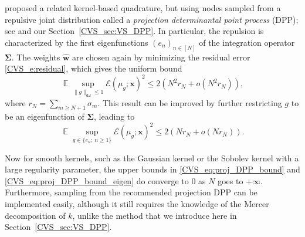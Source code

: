 \documentclass[twoside,11pt]{book}
\numberwithin{theorem}{chapter}
\numberwithin{definition}{chapter}
\numberwithin{proposition}{chapter}
\numberwithin{corollary}{chapter}
\numberwithin{example}{chapter}
\numberwithin{lemma}{chapter}
\DeclareMathOperator{\EX}{\mathbb{E}}
\newcommand{\pc}[1]{\textcolor{blue}{#1}}
\newcommand{\rb}[1]{\textcolor{magenta}{#1}}
\begin{document}
\cite{BeBaCh19} proposed a related kernel-based quadrature, but using nodes sampled from a repulsive joint distribution called a \emph{projection determinantal point process} (DPP); see \citep{HoKrPeVi06} and our Section~\ref{CVS_sec:VS_DPP}. In particular, the repulsion is characterized by the first eigenfunctions $(e_{n})_{n \in [N]}$ of the integration operator $\bm{\Sigma}$. The weights $\hat{\bm{w}}$ are chosen again by minimizing the residual error \eqref{CVS_e:residual},
which gives the uniform bound
\begin{equation}\label{CVS_eq:proj_DPP_bound}
\EX \sup\limits_{\|g\|_{\mathrm{d}\omega} \leq 1} \mathcal{E}(\mu_{g}; \bm{x})^{2} \leq 2(N^{2} r_{N} + o(N^{2} r_{N})) ,
\end{equation}
where $r_{N} = \sum\limits_{m \geq N+1} \sigma_{m}$. This result can be improved by further restricting $g$ to be an eigenfunction of $\bm{\Sigma}$, leading to
\begin{equation}\label{CVS_eq:proj_DPP_bound_eigen}
\EX \sup\limits_{g \in \{e_{n};~ n\geq 1\}} \mathcal{E}(\mu_{g}; \bm{x})^{2} \leq 2(N r_{N} + o(N r_{N})).
\end{equation}

Now for smooth kernels, such as the Gaussian kernel or the Sobolev kernel with a large regularity parameter, the upper bounds in \eqref{CVS_eq:proj_DPP_bound} and \eqref{CVS_eq:proj_DPP_bound_eigen} do converge to $0$ as $N$ goes to $+\infty$. Furthermore, sampling from the recommended projection DPP can be implemented easily, although it still requires the knowledge of the Mercer decomposition of $k$, unlike the method that we introduce here in Section~\ref{CVS_sec:VS_DPP}.

\end{document}
